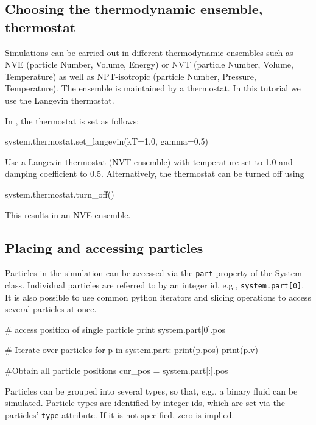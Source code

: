 \documentclass[
paper=a4,                       %
fontsize=11pt,                  %
twoside,                        %
footsepline,                    %
headsepline,                    %
headinclude=false,              %
footinclude=false,              %
pagesize,                       %
]{scrartcl}
\begin{document}
\subsection{Choosing the thermodynamic ensemble, thermostat}
Simulations can be carried out in different thermodynamic ensembles such as NVE (particle Number, Volume, Energy) or NVT (particle Number, Volume, Temperature) as well as NPT-isotropic (particle Number, Pressure, Temperature).
The ensemble is maintained by a thermostat. In this tutorial we use the Langevin thermostat.

In \es{}, the thermostat is set as follows:
{\small\vspace{0,2cm}
\begin{pypresso}
system.thermostat.set_langevin(kT=1.0, gamma=0.5)
\end{pypresso}}\vspace{0,2cm}
\noindent Use a Langevin thermostat (NVT ensemble) with temperature set to 1.0 and damping coefficient to 0.5. Alternatively, the thermostat can be turned off using
{\small\vspace{0,2cm}
\begin{pypresso}
system.thermostat.turn_off()
\end{pypresso}}\vspace{0,2cm}
\noindent This results in an NVE ensemble.


\subsection{Placing and accessing particles}

Particles in the simulation can be accessed via the \texttt{part}-property of the System class. Individual particles are referred to by an integer id, e.g., \texttt{system.part[0]}. It is also possible to use common python iterators and slicing operations to access several particles at once.
\begin{pypresso}
# access position of single particle
print system.part[0].pos

# Iterate over particles
for p in system.part:
    print(p.pos)
    print(p.v)

#Obtain all particle positions
cur_pos = system.part[:].pos
\end{pypresso}
Particles can be grouped into several types, so that, e.g., a binary fluid can be simulated. Particle types are identified by integer ids, which are set via the particles' \texttt{type} attribute. If it is not specified, zero is implied.
\end{document}

